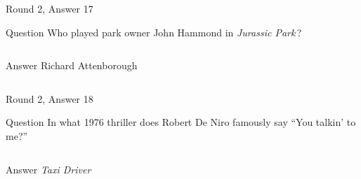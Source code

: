 \documentclass[11pt]{beamer}
\begin{document}
\begin{frame}[t]{Round 2, Answer 17}
  \vspace{2em}
  \begin{block}{Question}
    Who played park owner John Hammond in \emph{Jurassic Park}\,?
  \end{block}
  \pause{}
  \begin{columns}[T,totalwidth=\linewidth]
    \begin{column}{0.35\linewidth}
      \begin{block}{Answer}
        Richard Attenborough
      \end{block}
    \end{column}
    \begin{column}{0.6\linewidth}
      \begin{center}
        \texttt{[image: \{Images/John-Hammond]}.jpg}
      \end{center}
    \end{column}
  \end{columns}
\end{frame}


\begin{frame}[t]{Round 2, Answer 18}
  \vspace{2em}
  \begin{block}{Question}
    In what 1976 thriller does Robert De Niro famously say ``You talkin' to me?''
  \end{block}
  \pause{}
  \begin{columns}[T,totalwidth=\linewidth]
    \begin{column}{0.35\linewidth}
      \begin{block}{Answer}
        \emph{Taxi Driver}
      \end{block}
    \end{column}
    \begin{column}{0.6\linewidth}
      \begin{center}
        \texttt{[image: \{Images/talkintome]}.jpg}
      \end{center}
    \end{column}
  \end{columns}
\end{frame}
\end{document}

